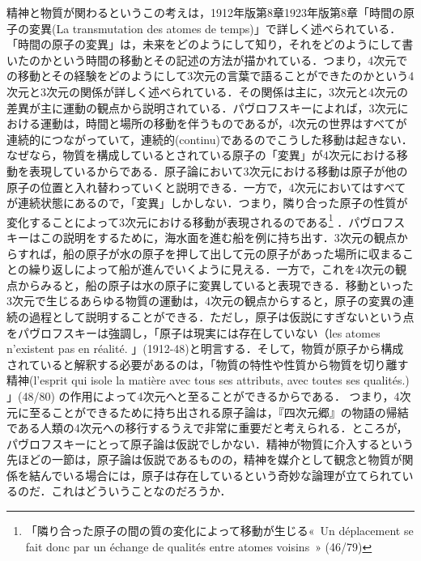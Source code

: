 精神と物質が関わるというこの考えは，1912年版第8章1923年版第8章「時間の原子の変異(La transmutation des atomes de temps)」で詳しく述べられている．「時間の原子の変異」は，未来をどのようにして知り，それをどのようにして書いたのかという時間の移動とその記述の方法が描かれている．つまり，4次元での移動とその経験をどのようにして3次元の言葉で語ることができたのかという4次元と3次元の関係が詳しく述べられている．その関係は主に，3次元と4次元の差異が主に運動の観点から説明されている．パヴロフスキーによれば，3次元における運動は，時間と場所の移動を伴うものであるが，4次元の世界はすべてが連続的につながっていて，連続的(continu)であるのでこうした移動は起きない．なぜなら，物質を構成しているとされている原子の「変異」が4次元における移動を表現しているからである．原子論において3次元における移動は原子が他の原子の位置と入れ替わっていくと説明できる．一方で，4次元においてはすべてが連続状態にあるので，「変異」しかしない．つまり，隣り合った原子の性質が変化することによって3次元における移動が表現されるのである\footnote{「隣り合った原子の間の質の変化によって移動が生じる«~Un déplacement se fait donc par un échange de qualités entre atomes voisins~» (46/79)}  ．パヴロフスキーはこの説明をするために，海水面を進む船を例に持ち出す．3次元の観点からすれば，船の原子が水の原子を押して出して元の原子があった場所に収まることの繰り返しによって船が進んでいくように見える．一方で，これを4次元の観点からみると，船の原子は水の原子に変異していると表現できる．移動といった3次元で生じるあらゆる物質の運動は，4次元の観点からすると，原子の変異の連続の過程として説明することができる．ただし，原子は仮説にすぎないという点をパヴロフスキーは強調し，「原子は現実には存在していない（les atomes n'existent pas en réalité. 」(1912-48)と明言する．そして，物質が原子から構成されていると解釈する必要があるのは，「物質の特性や性質から物質を切り離す精神(l'esprit qui isole la matière avec tous ses attributs, avec toutes ses qualités.) 」(48/80) の作用によって4次元へと至ることができるからである． つまり，4次元に至ることができるために持ち出される原子論は，『四次元郷』の物語の帰結である人類の4次元への移行するうえで非常に重要だと考えられる．ところが，パヴロフスキーにとって原子論は仮説でしかない．精神が物質に介入するという先ほどの一節は，原子論は仮説であるものの，精神を媒介として観念と物質が関係を結んでいる場合には，原子は存在しているという奇妙な論理が立てられているのだ．これはどういうことなのだろうか．

